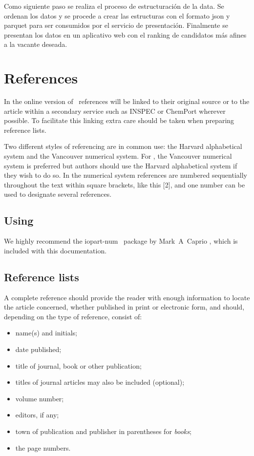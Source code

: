 \documentclass[a4paper]{jpconf}
\begin{document}
Como siguiente paso se realiza el proceso de estructuración de la data. Se ordenan los datos y se procede a crear las estructuras con el formato json y parquet para ser consumidos por el servicio de presentación. Finalmente se presentan los datos en un aplicativo web con el ranking de candidatos más afines a la vacante deseada.


\section{References}
In the online version of \jpcs\ references will be linked to their original source or to the article within a secondary service such as INSPEC or ChemPort wherever possible. To facilitate this linking extra care should be taken when preparing reference lists. 

Two different styles of referencing are in common use: the Harvard alphabetical system and the Vancouver numerical system.  For \jpcs, the Vancouver numerical system is preferred but authors should use the Harvard alphabetical system if they wish to do so. In the numerical system references are numbered sequentially throughout the text within square brackets, like this [2], and one number can be used to designate several references.  

\subsection{Using \BibTeX}
We highly recommend the {\ttfamily\textbf\selectfont iopart-num} \BibTeX\ package by Mark~A~Caprio \cite{iopartnum}, which is included with this documentation.

\subsection{Reference lists}
A complete reference should provide the reader with enough information to locate the article concerned, whether published in print or electronic form, and should, depending on the type of reference, consist of:  

\begin{itemize}
\item name(s) and initials;
\item date published;
\item title of journal, book or other publication; 
\item titles of journal articles may also be included (optional);
\item volume number;
\item editors, if any;
\item town of publication and publisher in parentheses for {\it books};
\item the page numbers.
\end{itemize}
\end{document}
